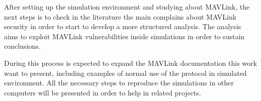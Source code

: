 After setting up the simulation environment and studying about MAVLink, the next steps is to check in the literature the main complains about MAVLink security in order to start to develop a more structured analysis. The analysis aims to exploit MAVLink vulnerabilities inside simulations in order to sustain conclusions.

During this process is expected to expand the MAVLink documentation this work want to present, including examples of normal use of the protocol in simulated environment. All the necessary steps to reproduce the simulations in other computers will be presented in order to help in related projects.
